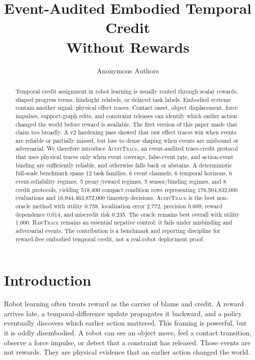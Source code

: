 \documentclass{article}
\title{Event-Audited Embodied Temporal Credit\\Without Rewards}
\author{Anonymous Authors}
\newcommand{\method}{\textsc{AuditTrace}\xspace}
\newcommand{\rawtrace}{\textsc{RawTrace}\xspace}
\begin{document}
\maketitle

\begin{abstract}
Temporal credit assignment in robot learning is usually routed through scalar rewards, shaped progress terms, hindsight relabels, or delayed task labels. Embodied systems contain another signal: physical effect traces. Contact onset, object displacement, force impulses, support-graph edits, and constraint releases can identify which earlier action changed the world before reward is available. The first version of this paper made that claim too broadly. A v2 hardening pass showed that raw effect traces win when events are reliable or partially missed, but lose to dense shaping when events are misbound or adversarial. We therefore introduce \method, an event-audited trace-credit protocol that uses physical traces only when event coverage, false-event rate, and action-event binding are sufficiently reliable, and otherwise falls back or abstains. A deterministic full-scale benchmark spans 12 task families, 6 event channels, 6 temporal horizons, 6 event-reliability regimes, 5 proxy/reward regimes, 5 sensor/binding regimes, and 8 credit protocols, yielding 518,400 compact condition rows representing 176,504,832,000 evaluations and 16,944,463,872,000 timestep decisions. \method is the best non-oracle method with utility 0.758, localization error 2.772, precision 0.609, reward dependence 0.014, and miscredit risk 0.235. The oracle remains best overall with utility 1.000. \rawtrace remains an essential negative control: it fails under misbinding and adversarial events. The contribution is a benchmark and reporting discipline for reward-free embodied temporal credit, not a real-robot deployment proof.
\end{abstract}

\section{Introduction}

Robot learning often treats reward as the carrier of blame and credit. A reward arrives late, a temporal-difference update propagates it backward, and a policy eventually discovers which earlier action mattered. This framing is powerful, but it is oddly disembodied. A robot can see an object move, feel a contact transition, observe a force impulse, or detect that a constraint has released. Those events are not rewards. They are physical evidence that an earlier action changed the world.
\end{document}
